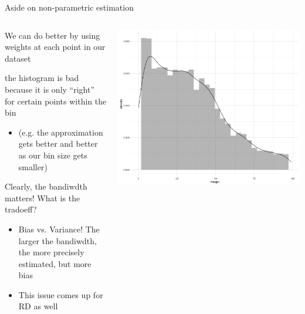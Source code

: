 \documentclass[notes,11pt, aspectratio=169]{beamer}
\newenvironment{wideitemize}{\itemize\addtolength{\itemsep}{10pt}}{\enditemize}
\begin{document}
\begin{frame}{Aside on non-parametric estimation}
  \begin{columns}[onlytextwidth, T] %
    \begin{column}{.6\textwidth}
      \begin{wideitemize}
      \item   We can do better by using weights at each point in our dataset
      \item the histogram is bad because it is only ``right'' for certain
        points within the bin
        \begin{itemize}
        \item     (e.g. the approximation gets better and better as our bin size gets smaller)
        \end{itemize}
      \item   Clearly, the bandiwdth matters! What is the tradoeff?
        \begin{itemize}
        \item Bias vs. Variance! The larger the bandiwdth, the more
          precisely estimated, but more bias
        \item This issue comes up for RD as well
        \end{itemize}
      \end{wideitemize}
    \end{column}%
    \hfill%
    \begin{column}{.4\textwidth}
      \includegraphics[width=\linewidth]{images/lee_density.png}
    \end{column}%
  \end{columns}
\end{frame}
\end{document}
